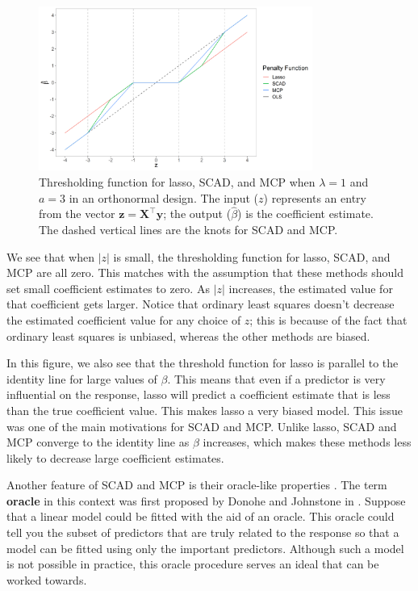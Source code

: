 \documentclass{article}
\begin{document}
\begin{figure}[!h]
	\centering
	\includegraphics[width = 0.8\textwidth]{images/lasso-scad-mcp-solution.png}
	\captionsetup{width = 0.8\textwidth}
	\caption{Thresholding function for lasso, SCAD, and MCP when $\lambda = 1$ and $a = 3$ in an orthonormal design. The input ($z$) represents an entry from the vector $\mathbf{z}=\mathbf{X}^\top \mathbf{y}$; the output ($\hat{\beta}$) is the coefficient estimate. The dashed vertical lines are the knots for SCAD and MCP.}
	\label{fig:prediction}
\end{figure}

We see that when $\vert z \vert$ is small, the thresholding function for lasso, SCAD, and MCP are all zero. This matches with the assumption that these methods should set small coefficient estimates to zero. As $\vert z \vert$ increases, the estimated value for that coefficient gets larger. Notice that ordinary least squares doesn't decrease the estimated coefficient value for any choice of $z$; this is because of the fact that ordinary least squares is unbiased, whereas the other methods are biased.

In this figure, we also see that the threshold function for lasso is parallel to the identity line for large values of $\beta$. This means that even if a predictor is very influential on the response, lasso will predict a coefficient estimate that is less than the true coefficient value. This makes lasso a very biased model. This issue was one of the main motivations for SCAD and MCP. Unlike lasso, SCAD and MCP converge to the identity line as $\beta$ increases, which makes these methods less likely to decrease large coefficient estimates.

Another feature of SCAD and MCP is their oracle-like properties \cite{fan2001variable, zhang2010nearly}. The term \textbf{oracle} in this context was first proposed by Donohe and Johnstone in \cite{donoho1994ideal}. Suppose that a linear model could be fitted with the aid of an oracle. This oracle could tell you the subset of predictors that are truly related to the response so that a model can be fitted using only the important predictors. Although such a model is not possible in practice, this oracle procedure serves an ideal that can be worked towards.
\end{document}
